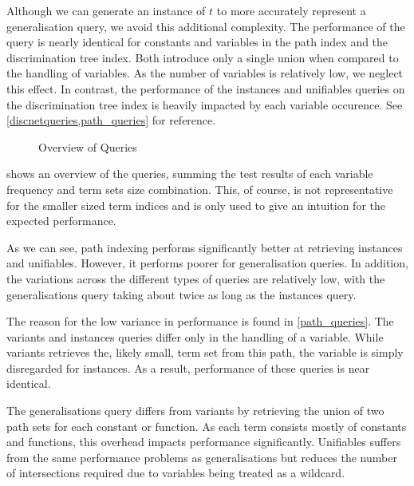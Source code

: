 Although we can generate an instance of $t$ to more accurately represent a generalisation query, we avoid this additional complexity. The performance of the query is nearly identical for constants and variables in the path index and the discrimination tree index. Both introduce only a single union when compared to the handling of variables. As the number of variables is relatively low, we neglect this effect. In contrast, the performance of the instances and unifiables queries on the discrimination tree index is heavily impacted by each variable occurence. See \cref{discnetqueries,path_queries} for reference.

\begin{figure}[h]
  \centering
{}
\caption{Overview of Queries}
\label{queries}
\end{figure}

 shows an overview of the queries, summing the test results of each variable frequency and term sets size combination. This, of course, is not representative for the smaller sized term indices and is only used to give an intuition for the expected performance.

As we can see, path indexing performs significantly better at retrieving instances and unifiables. However, it performs poorer for generalisation queries. In addition, the variations across the different types of queries are relatively low, with the generalisations query taking about twice as long as the instances query.

The reason for the low variance in performance is found in \cref{path_queries}. The variants and instances queries differ only in the handling of a variable. While variants retrieves the, likely small, term set from this path, the variable is simply disregarded for instances. As a result, performance of these queries is near identical.

The generalisations query differs from variants by retrieving the union of two path sets for each constant or function. As each term consists mostly of constants and functions, this overhead impacts performance significantly. Unifiables suffers from the same performance problems as generalisations but reduces the number of intersections required due to variables being treated as a wildcard.

